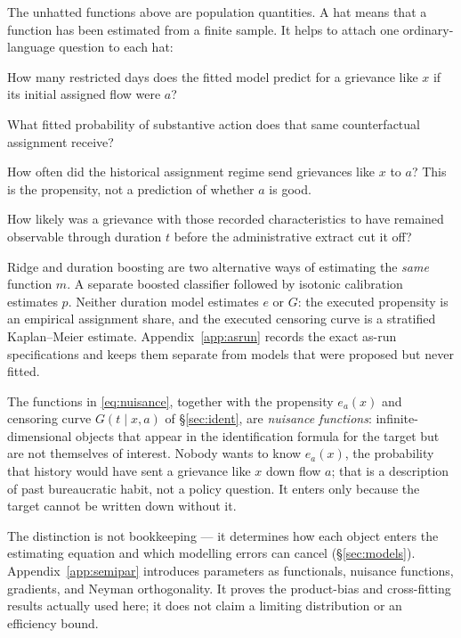 \documentclass[11pt,a4paper]{article}
\theoremstyle{plain}
\theoremstyle{definition}
\theoremstyle{remark}
\begin{document}
The unhatted functions above are population quantities. A hat means that a function has been
estimated from a finite sample. It helps to attach one ordinary-language question to each hat:
\begin{description}[leftmargin=2.2cm,style=nextline]
\item[$\hat m_a(x)$] How many restricted days does the fitted model predict for a grievance like
$x$ if its initial assigned flow were $a$?
\item[$\hat p_a(x)$] What fitted probability of substantive action does that same counterfactual
assignment receive?
\item[$\hat e_a(x)$] How often did the historical assignment regime send grievances like $x$ to
$a$? This is the propensity, not a prediction of whether $a$ is good.
\item[$\hat G(t\mid x,a)$] How likely was a grievance with those recorded characteristics to have
remained observable through duration $t$ before the administrative extract cut it off?
\end{description}
Ridge and duration boosting are two alternative ways of estimating the \emph{same} function
$m$. A separate boosted classifier followed by isotonic calibration estimates $p$. Neither
duration model estimates $e$ or $G$: the executed propensity is an empirical assignment share,
and the executed censoring curve is a stratified Kaplan--Meier estimate. Appendix~\ref{app:asrun}
records the exact as-run specifications and keeps them separate from models that were proposed
but never fitted.

The functions in \eqref{eq:nuisance}, together with the propensity $e_a(x)$ and censoring
curve $G(t\mid x,a)$ of \S\ref{sec:ident}, are \emph{nuisance functions}: infinite-dimensional
objects that appear in the identification formula for the target but are not themselves of
interest. Nobody wants to know $e_a(x)$, the probability that history would have sent a
grievance like $x$ down flow $a$; that is a description of past bureaucratic habit, not a
policy question. It enters only because the target cannot be written down without it.

The distinction is not bookkeeping --- it determines how each object enters the estimating
equation and which modelling errors can cancel (\S\ref{sec:models}).
Appendix~\ref{app:semipar} introduces parameters as functionals, nuisance functions, gradients,
and Neyman orthogonality. It proves the product-bias and cross-fitting results actually used
here; it does not claim a limiting distribution or an efficiency bound.
\end{document}
